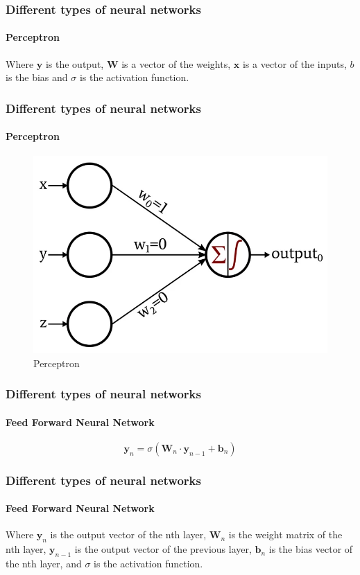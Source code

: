 \documentclass{beamer}
\begin{document}
\begin{frame}
\frametitle{Different types of neural networks}
\framesubtitle{Perceptron}
Where $\textbf{y}$ is the output, $\textbf{W}$ is a vector of the weights, $\textbf{x}$ is a vector of the inputs, $b$ is the bias and $\sigma$ is the activation function.
\end{frame}

\begin{frame}
\frametitle{Different types of neural networks}
\framesubtitle{Perceptron}
\begin{figure}[h!]
    \includegraphics[width=\textwidth]{./assets/perceptron.png}
    \caption{Perceptron}
    \label{fig:perceptron}
\end{figure}
\end{frame}

\begin{frame}
\frametitle{Different types of neural networks}
\framesubtitle{Feed Forward Neural Network}
\begin{equation}
    \textbf{y}_n=\sigma{(\textbf{W}_n\cdot\textbf{y}_{n-1} + \textbf{b}_n)}
    \label{eq:feed-forward}
\end{equation}
\end{frame}

\begin{frame}
\frametitle{Different types of neural networks}
\framesubtitle{Feed Forward Neural Network}
Where $\textbf{y}_n$ is the output vector of the nth layer, $\textbf{W}_n$ is the weight matrix of the nth layer, $\textbf{y}_{n-1}$ is the output vector of the previous layer, $\textbf{b}_n$ is the bias vector of the nth layer, and $\sigma$ is the activation function.
\end{frame}
\end{document}
